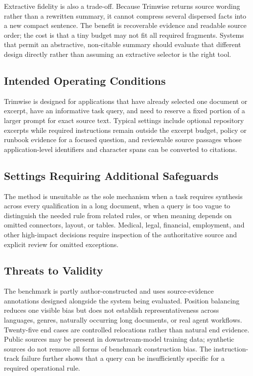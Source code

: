 \documentclass[
]{article}
\begin{document}
Extractive fidelity is also a trade-off. Because Trimwise returns source
wording rather than a rewritten summary, it cannot compress several
dispersed facts into a new compact sentence. The benefit is recoverable
evidence and readable source order; the cost is that a tiny budget may
not fit all required fragments. Systems that permit an abstractive,
non-citable summary should evaluate that different design directly
rather than assuming an extractive selector is the right tool.

\subsection{Intended Operating Conditions}\label{appropriate-use-cases}

Trimwise is designed for applications that have already selected one
document or excerpt, have an informative task query, and need to reserve
a fixed portion of a larger prompt for exact source text. Typical
settings include optional repository excerpts while required
instructions remain outside the excerpt budget, policy or runbook
evidence for a focused question, and reviewable source passages whose
application-level identifiers and character spans can be converted to
citations.

\subsection{Settings Requiring Additional Safeguards}\label{inappropriate-use-cases}

The method is unsuitable as the sole mechanism when a task requires
synthesis across every qualification in a long document, when a query is
too vague to distinguish the needed rule from related rules, or when
meaning depends on omitted connectors, layout, or tables. Medical,
legal, financial, employment, and other high-impact decisions require
inspection of the authoritative source and explicit review for omitted
exceptions.

\subsection{Threats to Validity}\label{threats-to-validity}

The benchmark is partly author-constructed and uses source-evidence
annotations designed alongside the system being evaluated. Position
balancing reduces one visible bias but does not establish
representativeness across languages, genres, naturally occurring long
documents, or real agent workflows. Twenty-five end cases are controlled
relocations rather than natural end evidence. Public sources may be
present in downstream-model training data; synthetic sources do not
remove all forms of benchmark construction bias. The instruction-track
failure further shows that a query can be insufficiently specific for a
required operational rule.
\end{document}
